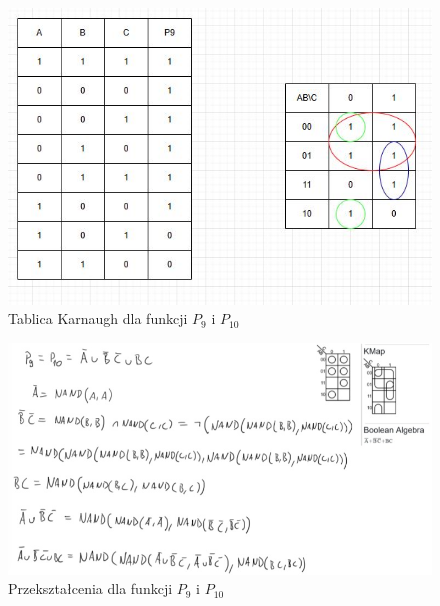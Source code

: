 \documentclass[11pt]{article}
\begin{document}
\begin{figure}[H]
\centering
\includegraphics[width=.9\linewidth]{../../CW0POPRW/P9.JPG}
\caption{Tablica Karnaugh dla funkcji \(P_9\) i \(P_{10}\)}
\end{figure}
\begin{figure}[H]
\centering
\includegraphics[width=.9\linewidth]{p9p10.jpg}
\caption{Przekształcenia dla funkcji \(P_9\) i \(P_{10}\)}
\end{figure}
\end{document}
